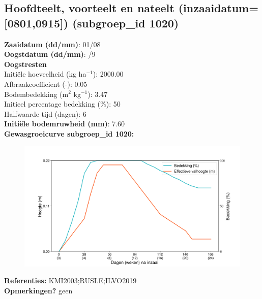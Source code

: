 \documentclass{article}
\begin{document}
 \subsection{Hoofdteelt, voorteelt en nateelt (inzaaidatum=[0801,0915]) (subgroep\_id 1020)} 
  \textbf{Zaaidatum (dd/mm)}: 01/08  \vspace{0.10cm} \\ 
  \textbf{Oogstdatum (dd/mm)}: /9  \vspace{0.10cm} \\ 
  \textbf{Oogstresten} \vspace{0.05cm} \\ 
  \tab Initi\"{e}le hoeveelheid (kg ha$^{-1}$): 2000.00 \vspace{0.05cm} \\ 
  \tab Afbraakcoefficient (-): 0.05 \vspace{0.05cm} \\ 
  \tab Bodembedekking (m$^2$ kg$^{-1}$): 3.47 \vspace{0.05cm} \\ 
  \tab Initieel percentage bedekking (\%): 50 \vspace{0.05cm} \\ 
  \tab Halfwaarde tijd (dagen): 6 \vspace{0.05cm} \\ 
  \textbf{Initi\"{e}le bodemruwheid (mm)}: 7.60 \vspace{0.05cm} \\ 
  \textbf{Gewasgroeicurve subgroep\_id 1020:} 
 \begin{center} \begin{figure}[H] \includegraphics[width=12.5cm]{temp/1020.png} \end{figure} \end{center} 
  \textbf{Referenties:} KMI2003;RUSLE;ILVO2019 \vspace{0.10cm} \\ 
  \textbf{Opmerkingen?} geen \vspace{0.10cm} \\ 
 \newpage 
\end{document}
